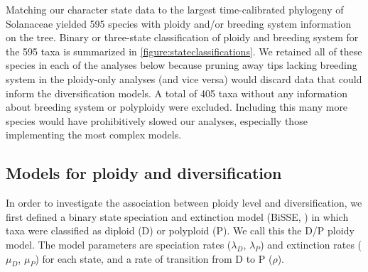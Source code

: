 Matching our character state data to the largest time-calibrated phylogeny of Solanaceae \citep{sarkinen_2013} yielded 595 species with ploidy and/or breeding system information on the tree.
Binary or three-state classification of ploidy and breeding system for the 595 taxa is summarized in \cref{figure:stateclassifications}.
We retained all of these species in each of the analyses below because pruning away tips lacking breeding system in the ploidy-only analyses (and vice versa) would discard data that could inform the diversification models.
A total of 405 taxa without any information about breeding system or polyploidy were excluded.
Including this many more species would have prohibitively slowed our analyses, especially those implementing the most complex models.


\subsection{Models for ploidy and diversification}

In order to investigate the association between ploidy level and diversification, we first defined a binary state speciation and extinction model (BiSSE, \citealt{maddison_2007}) in which taxa were classified as diploid (D) or polyploid (P).
We call this the D/P ploidy model.
The model parameters are speciation rates ($\lambda_D$, $\lambda_P$) and extinction rates ($\mu_D$, $\mu_P$) for each state, and a rate of transition from D to P ($\rho$).


